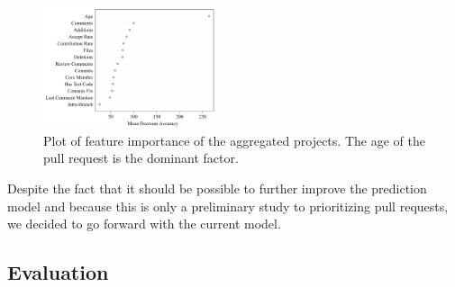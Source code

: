 \begin{figure}
  \centering
  \includegraphics[width=0.45\textwidth]{../figs/mean-decrease-accuracy.pdf}
  \caption[Plot of feature importance]
   {Plot of feature importance of the aggregated projects. The age of the pull request is the dominant factor.}
  \label{fig:feature-importance}
\end{figure}

Despite the fact that it should be possible to further improve the prediction model and because this is only a preliminary study to prioritizing pull requests, we decided to go forward with the current model.

\subsection{Evaluation}
\label{sec:evaluation}

